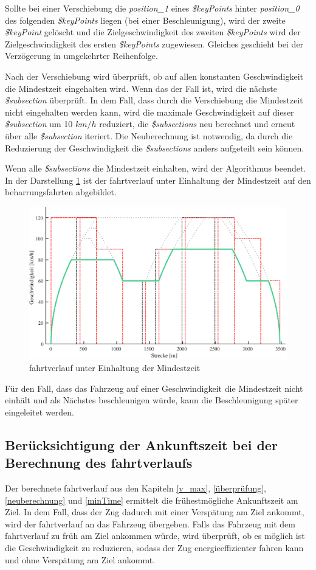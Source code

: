 Sollte bei einer Verschiebung die \textit{position\_1} eines \textit{\$keyPoints} hinter \textit{position\_0} des folgenden \textit{\$keyPoints} liegen (bei einer Beschleunigung), wird der zweite \textit{\$keyPoint} gelöscht und die Zielgeschwindigkeit des zweiten \textit{\$keyPoints} wird der Zielgeschwindigkeit des ersten \textit{\$keyPoints} zugewiesen. Gleiches geschieht bei der Verzögerung in umgekehrter Reihenfolge. 

Nach der Verschiebung wird überprüft, ob auf allen konstanten Geschwindigkeit die Mindestzeit eingehalten wird. Wenn das der Fall ist, wird die nächste \textit{\$subsection} überprüft. In dem Fall, dass durch die Verschiebung die Mindestzeit nicht eingehalten werden kann, wird die maximale Geschwindigkeit auf dieser \textit{\$subsection} um 10 $km/h$ reduziert, die \textit{\$subsections} neu berechnet und erneut über alle \textit{\$subsection} iteriert. Die Neuberechnung ist notwendig, da durch die Reduzierung der Geschwindigkeit die \textit{\$subsections} anders aufgeteilt sein können.

Wenn alle \textit{\$subsections} die Mindestzeit einhalten, wird der Algorithmus beendet. In der Darstellung \ref{fig:it9} ist der \Gls{fahrtverlauf} unter Einhaltung der Mindestzeit auf den \Gls{beharrungsfahrt}en abgebildet.
\begin{figure}
\includegraphics[width=\linewidth]{../images/matlab/it9.pdf}
\caption{\Gls{fahrtverlauf} unter Einhaltung der Mindestzeit}
\label{fig:it9}
\end{figure}
Für den Fall, dass das Fahrzeug auf einer Geschwindigkeit die Mindestzeit nicht einhält und als Nächstes beschleunigen würde, kann die Beschleunigung später eingeleitet werden. 

\subsection{Berücksichtigung der Ankunftszeit bei der Berechnung des \Gls{fahrtverlauf}s} \label{time}
Der berechnete \Gls{fahrtverlauf} aus den Kapiteln \ref{v_max}, \ref{überprüfung}, \ref{neuberechnung} und \ref{minTime} ermittelt die frühestmögliche Ankunftszeit am Ziel. In dem Fall, dass der Zug dadurch mit einer Verspätung am Ziel ankommt, wird der \Gls{fahrtverlauf} an das Fahrzeug übergeben. Falls das Fahrzeug mit dem \Gls{fahrtverlauf} zu früh am Ziel ankommen würde, wird überprüft, ob es möglich ist die Geschwindigkeit zu reduzieren, sodass der Zug energieeffizienter fahren kann und ohne Verspätung am Ziel ankommt. 

